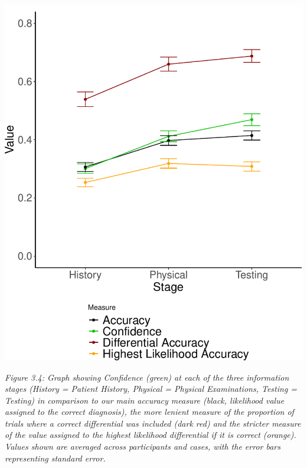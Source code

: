 \documentclass[a4paper, nobind]{templates/ociamthesis}
\begin{document}
\begin{center}\includegraphics[width=1\linewidth]{_main_files/figure-latex/meyerGraph-1} \end{center}

\emph{Figure 3.4: Graph showing Confidence (green) at each of the three information stages (History = Patient History, Physical = Physical Examinations, Testing = Testing) in comparison to our main accuracy measure (black, likelihood value assigned to the correct diagnosis), the more lenient measure of the proportion of trials where a correct differential was included (dark red) and the stricter measure of the value assigned to the highest likelihood differential if it is correct (orange). Values shown are averaged across participants and cases, with the error bars representing standard error.}\\
\end{document}
